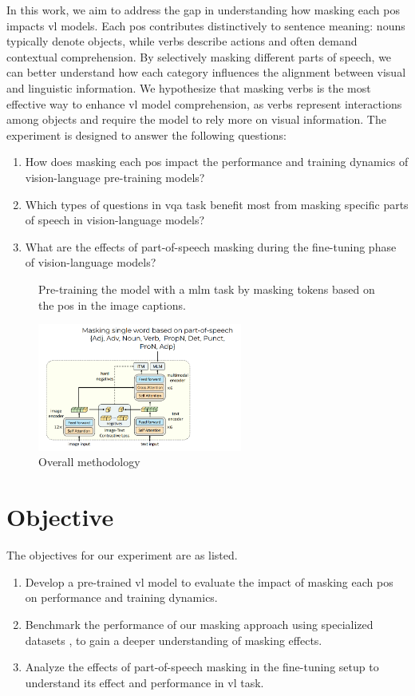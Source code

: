 In this work, we aim to address the gap in understanding how masking each \acrfull{pos} impacts \acrshort{vl} models.
Each \acrshort{pos} contributes distinctively to sentence meaning: nouns typically denote objects, while verbs describe actions and often demand contextual comprehension.
By selectively masking different parts of speech, we can better understand how each category influences the alignment between visual and linguistic information.
We hypothesize that masking verbs is the most effective way to enhance \acrshort{vl} model comprehension, as verbs represent interactions among objects and require the model to rely more on visual information.
The experiment is designed to answer the following questions:
\begin{enumerate}
    \item How does masking each \acrshort{pos} impact the performance and training dynamics of vision-language pre-training models?
    \item Which types of questions in \acrfull{vqa} task benefit most from masking specific parts of speech in vision-language models?
    \item What are the effects of part-of-speech masking during the fine-tuning phase of vision-language models?
\end{enumerate}

\begin{figure}[h]
    \caption{Overall methodology}
    \label{fig:overview}
    Pre-training the model with a \acrshort{mlm} task by masking tokens based on the \acrshort{pos} in the image captions.
    \begin{center}
        \includegraphics[width=0.6\textwidth]{Images/overview.png}
    \end{center}
    \small
\end{figure}

\section{Objective}
The objectives for our experiment are as listed.
\begin{enumerate}
    \item Develop a pre-trained \acrshort{vl} model to evaluate the impact of masking each \acrshort{pos} on performance and training dynamics.
    \item Benchmark the performance of our masking approach using specialized datasets \cite{valse, foil-dataset}, to gain a deeper understanding of masking effects.
    \item Analyze the effects of part-of-speech masking in the fine-tuning setup to understand its effect and performance in \acrshort{vl} task.
\end{enumerate}

